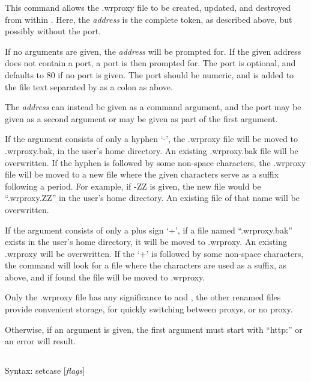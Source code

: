This command allows the {\vt .wrproxy} file to be created, updated,
and destroyed from within {\Xic}.  Here, the {\it address} is the
complete token, as described above, but possibly without the port.

If no arguments are given, the {\it address} will be prompted for.  If
the given address does not contain a port, a port is then prompted
for.  The port is optional, and defaults to 80 if no port is given. 
The port should be numeric, and is added to the file text separated by
as a colon as above.

The {\it address} can instead be given as a command argument, and the
port may be given as a second argument or may be given as part of the
first argument.

If the argument consists of only a hyphen `{\vt -}', the {\vt
.wrproxy} file will be moved to {\vt .wrproxy.bak}, in the user's home
directory.  An existing {\vt .wrproxy.bak} file will be overwritten. 
If the hyphen is followed by some non-space characters, the {\vt
.wrproxy} file will be moved to a new file where the given characters
serve as a suffix following a period.  For example, if {\vt -ZZ} is
given, the new file would be ``{\vt .wrproxy.ZZ}'' in the user's home
directory.  An existing file of that name will be overwritten.

If the argument consists of only a plus sign `{\vt +}', if a file
named ``{\vt .wrproxy.bak}'' exists in the user's home directory, it
will be moved to {\vt .wrproxy}.  An existing {\vt .wrproxy} will be
overwritten.  If the `{\vt +}' is followed by some non-space
characters, the command will look for a file where the characters are
used as a suffix, as above, and if found the file will be moved to
{\vt .wrproxy}.

Only the {\vt .wrproxy} file has any significance to {\Xic} and
{\WRspice}, the other renamed files provide convenient storage, for
quickly switching between proxys, or no proxy.

Otherwise, if an argument is given, the first argument must start with
``{\vt http:}'' or an error will result.


\subsection{}


Syntax: {\vt setcase} [{\it flags\/}]

